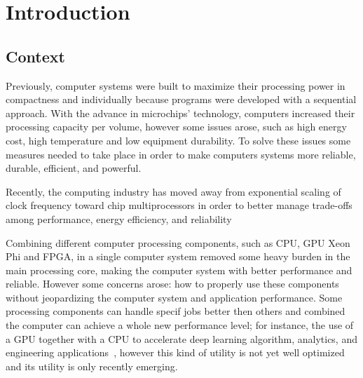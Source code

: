 \chapter{Introduction} \label{chap:intro}

\section*{}
\section{Context} \label{sec:context}

Previously, computer systems were built to maximize their processing power in compactness and individually because programs were developed with a sequential approach. With the advance in microchips' technology, computers increased their processing capacity per volume, however some issues arose, such as high energy cost, high temperature and low equipment durability. To solve these issues some measures needed to take place in order to make computers systems more reliable, durable, efficient, and powerful.

Recently, the computing industry has moved away from exponential scaling of clock frequency toward chip multiprocessors in order to better manage trade-offs among performance, energy efficiency, and reliability~\cite{Datta2008}

Combining different computer processing components, such as CPU, GPU Xeon Phi and FPGA, in a single computer system removed some heavy burden in the main processing core, making the computer system with better performance and reliable. However some concerns arose: how to properly use these components without jeopardizing the computer system and application performance. Some processing components can handle specif jobs better then others and combined the computer can achieve a whole new performance level; for instance, the use of a GPU together with a CPU to accelerate deep learning algorithm, analytics, and engineering applications~\cite{NvidiaGPU}, however this kind of utility is not yet well optimized and its utility is only recently emerging.







